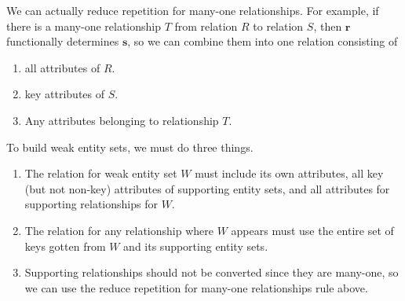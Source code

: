   \begin{theorem}
    We can actually reduce repetition for many-one relationships. For example, if there is a many-one relationship $T$ from relation $R$ to relation $S$, then $\mathbf{r}$ functionally determines $\mathbf{s}$, so we can combine them into one relation consisting of 
    \begin{enumerate}
      \item all attributes of $R$. 
      \item key attributes of $S$. 
      \item Any attributes belonging to relationship $T$. 
    \end{enumerate}
  \end{theorem}
  
  \begin{theorem}
    To build weak entity sets, we must do three things. 
    \begin{enumerate}
      \item The relation for weak entity set $W$ must include its own attributes, all key (but not non-key) attributes of supporting entity sets, and all attributes for supporting relationships for $W$. 
      \item The relation for any relationship where $W$ appears must use the entire set of keys gotten from $W$ and its supporting entity sets. 
      \item Supporting relationships should not be converted since they are many-one, so we can use the reduce repetition for many-one relationships rule above. 
    \end{enumerate}
  \end{theorem}


